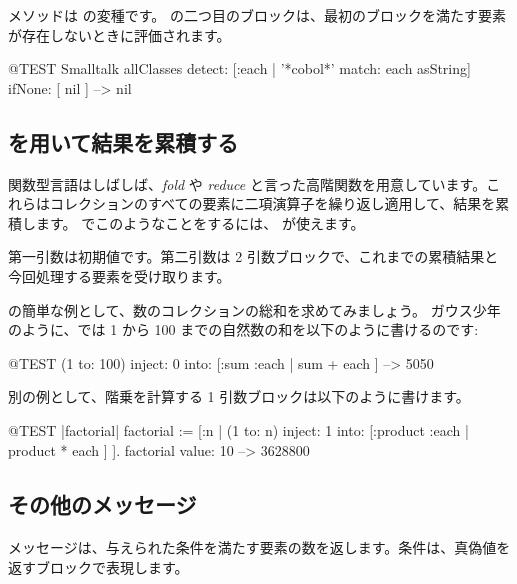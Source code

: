 \documentclass[a4paper,10pt,twoside]{book}
\begin{document}

 メソッドは  の変種です。
 の二つ目のブロックは、最初のブロックを満たす要素が存在しないときに評価されます。

\begin{code}{@TEST}
Smalltalk allClasses detect: [:each | '*cobol*' match: each asString] ifNone: [ nil ] --> nil
\end{code}

\subsection{ を用いて結果を累積する}
関数型言語はしばしば、\emph{fold} や \emph{reduce} と言った高階関数を用意しています。これらはコレクションのすべての要素に二項演算子を繰り返し適用して、結果を累積します。
\pharo でこのようなことをするには、 が使えます。

第一引数は初期値です。第二引数は 2 引数ブロックで、これまでの累積結果と今回処理する要素を受け取ります。

 の簡単な例として、数のコレクションの総和を求めてみましょう。
ガウス少年のように、\pharo では 1 から 100 までの自然数の和を以下のように書けるのです:
\begin{code}{@TEST}
(1 to: 100) inject: 0 into: [:sum :each | sum + each ] --> 5050
\end{code}

別の例として、階乗を計算する 1 引数ブロックは以下のように書けます。
\begin{code}{@TEST |factorial|}
factorial := [:n | (1 to: n) inject: 1 into: [:product :each | product * each ] ].
factorial value: 10 --> 3628800
\end{code}

\subsection{その他のメッセージ}

\paragraph{}  メッセージは、与えられた条件を満たす要素の数を返します。条件は、真偽値を返すブロックで表現します。
\end{document}
